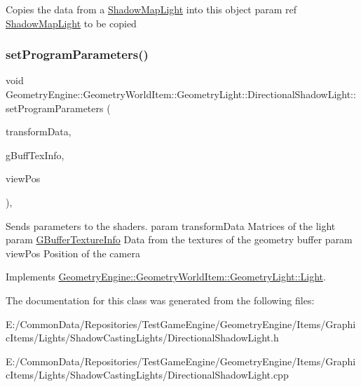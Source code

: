 Copies the data from a \mbox{\hyperlink{class_geometry_engine_1_1_geometry_world_item_1_1_geometry_light_1_1_shadow_map_light}{Shadow\+Map\+Light}} into this object param ref \mbox{\hyperlink{class_geometry_engine_1_1_geometry_world_item_1_1_geometry_light_1_1_shadow_map_light}{Shadow\+Map\+Light}} to be copied \mbox{\label{class_geometry_engine_1_1_geometry_world_item_1_1_geometry_light_1_1_directional_shadow_light_a9eb42440febb19231e71555f7fde2346}} 
\subsubsection{\texorpdfstring{setProgramParameters()}{setProgramParameters()}}
{\footnotesize\ttfamily void Geometry\+Engine\+::\+Geometry\+World\+Item\+::\+Geometry\+Light\+::\+Directional\+Shadow\+Light\+::set\+Program\+Parameters (\begin{DoxyParamCaption}\item[{const \mbox{\hyperlink{class_geometry_engine_1_1_lighting_transformation_data}{Lighting\+Transformation\+Data}} \&}]{transform\+Data,  }\item[{const \mbox{\hyperlink{class_geometry_engine_1_1_g_buffer_texture_info}{G\+Buffer\+Texture\+Info}} \&}]{g\+Buff\+Tex\+Info,  }\item[{const Q\+Vector3D \&}]{view\+Pos }\end{DoxyParamCaption})\hspace{0.3cm}{\ttfamily [protected]}, {\ttfamily [virtual]}}

Sends parameters to the shaders. param transform\+Data Matrices of the light param \mbox{\hyperlink{class_geometry_engine_1_1_g_buffer_texture_info}{G\+Buffer\+Texture\+Info}} Data from the textures of the geometry buffer param view\+Pos Position of the camera 

Implements \mbox{\hyperlink{class_geometry_engine_1_1_geometry_world_item_1_1_geometry_light_1_1_light_a366be5945389fe58df4bf5aa8c43138f}{Geometry\+Engine\+::\+Geometry\+World\+Item\+::\+Geometry\+Light\+::\+Light}}.



The documentation for this class was generated from the following files\+:\begin{DoxyCompactItemize}
\item 
E\+:/\+Common\+Data/\+Repositories/\+Test\+Game\+Engine/\+Geometry\+Engine/\+Items/\+Graphic\+Items/\+Lights/\+Shadow\+Casting\+Lights/Directional\+Shadow\+Light.\+h\item 
E\+:/\+Common\+Data/\+Repositories/\+Test\+Game\+Engine/\+Geometry\+Engine/\+Items/\+Graphic\+Items/\+Lights/\+Shadow\+Casting\+Lights/Directional\+Shadow\+Light.\+cpp\end{DoxyCompactItemize}
